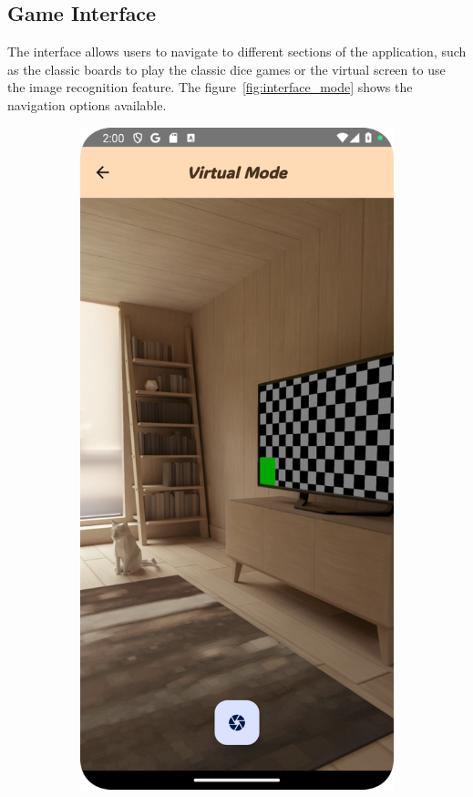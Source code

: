 \subsection{Game Interface}

The interface allows users to navigate to different sections of the application, such as the classic boards to play the classic dice games or the virtual screen to use the image recognition feature. The figure~\ref{fig:interface_mode} shows the navigation options available.

\begin{figure}[ht!]
    \centering
    \begin{subfigure}[b]{0.27\textwidth}
        \includegraphics[width=\textwidth]{img/virtual mode.png}

\end{subfigure}
\end{figure}
